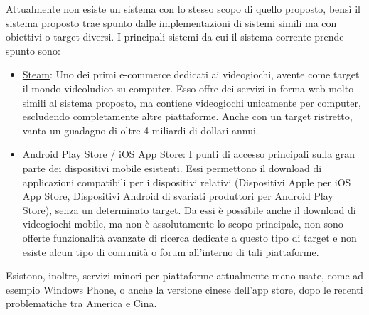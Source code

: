 Attualmente non esiste un sistema con lo stesso scopo di quello proposto, bensì il sistema proposto trae spunto dalle implementazioni di sistemi simili ma con obiettivi o target diversi. I principali sistemi da cui il sistema corrente prende spunto sono:
\begin{itemize}
	\item \href{https://store.steampowered.com/?l=italian}{Steam}: Uno dei primi e-commerce dedicati ai videogiochi, avente come target il mondo videoludico su computer. Esso offre dei servizi in forma web molto simili al sistema proposto, ma contiene videogiochi unicamente per computer, escludendo completamente altre piattaforme. Anche con un target ristretto, vanta un guadagno di oltre 4 miliardi di dollari annui.
	\item Android Play Store / iOS App Store: I punti di accesso principali sulla gran parte dei dispositivi mobile esistenti. Essi permettono il download di applicazioni compatibili per i dispositivi relativi (Dispositivi Apple per iOS App Store, Dispositivi Android di svariati produttori per Android Play Store), senza un determinato target. Da essi è possibile anche il download di videogiochi mobile, ma non è assolutamente lo scopo principale, non sono offerte funzionalità avanzate di ricerca dedicate a questo tipo di target e non esiste alcun tipo di comunità o forum all’interno di tali piattaforme.
\end{itemize}
Esistono, inoltre, servizi minori per piattaforme attualmente meno usate, come ad esempio Windows Phone, o anche la versione cinese dell’app store, dopo le recenti problematiche tra America e Cina. 